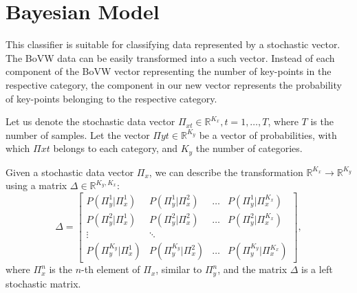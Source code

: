 \section{Bayesian Model}
This classifier is suitable for classifying data represented by a stochastic vector. The BoVW data can be easily transformed into a such vector. Instead of each component of the BoVW vector representing the number of key-points in the respective category, the component in our new vector represents the probability of key-points belonging to the respective category.

Let us denote the stochastic data vector $\Pi_{xt} \in \mathbb{R}^{K_x}, t=1,\dots,T$, where $T$ is the number of samples. Let the vector $\Pi{yt}\in \mathbb{R}^{K_y}$ be a vector of probabilities, with which $\Pi{xt}$ belongs to each category, and $K_y$ the number of categories.

Given a stochastic data vector $\Pi_x$, we can describe the transformation $\mathbb{R}^{K_x} \rightarrow \mathbb{R}^{K_y}$ using a matrix $\Delta \in \mathbb{R}^{K_y, K_x}$:
\begin{equation}
    \Delta =
    \begin{bmatrix}
        P(\Pi_y^1 | \Pi_x^1) & P(\Pi_y^1 | \Pi_x^2) & \dots & P(\Pi_y^1 | \Pi_x^{K_x})\\
        P(\Pi_y^2 | \Pi_x^1) & P(\Pi_y^2 | \Pi_x^2) & \dots & P(\Pi_y^2 | \Pi_x^{K_x})\\
        \vdots & \ddots\\
        P(\Pi_y^{K_y} | \Pi_x^1) & P(\Pi_y^{K_y} | \Pi_x^2) & \dots & P(\Pi_y^{K_y} | \Pi_x^{K_x})
    \end{bmatrix},
\end{equation}
where $\Pi_x^n$ is the $n$-th element of $\Pi_x$, similar to $\Pi_y^n$, and the matrix $\Delta$ is a left stochastic matrix.

